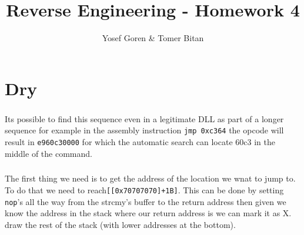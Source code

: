 \documentclass{article}
\begin{document}
\author{Yosef Goren \& Tomer Bitan}
\title{Reverse Engineering - Homework 4}
\maketitle
\tableofcontents

\part{Dry}
\section{}
Its possible to find this sequence even in a legitimate DLL as part of a longer sequence
for example in the assembly instruction \texttt{jmp 0xc364} the opcode will result in
\texttt{e960c30000} for which the automatic search can locate 60c3 in the middle of the
command.

\section{}
The first thing we need is to get the address of the location we wnat to jump to.
To do that we need to reach\texttt{[[0x70707070]+1B]}.
This can be done by setting \texttt{nop}'s all the way from the strcmy's buffer to the return
address then given we know the address in the stack where our return address is we
can mark it as X. draw the rest of the stack (with lower addresses at the bottom).
\end{document}
